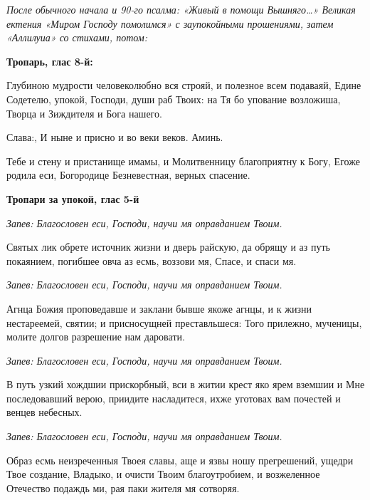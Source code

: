 \normalfont{} 


\mychapterending




\itshape  После обычного начала и 90-го псалма:\normalfont{} «Живый в помощи Вышняго…»
\itshape  Великая ектения\normalfont{} «Миром Господу помолимся» \itshape  с заупокойными
прошениями, затем\normalfont{} «Аллилуиа» \itshape  со стихами, потом:\normalfont{}


 

\bfseries Тропарь, глас 8-й:\normalfont{}

   Глубиною мудрости человеколюбно вся строяй, и полезное всем подаваяй,
Едине Содетелю, упокой, Господи, души раб Твоих: на Тя бо упование
возложиша, Творца и Зиждителя и Бога нашего.


   Слава:, И ныне и присно и во веки веков. Аминь.


   Тебе и стену и пристанище имамы, и Молитвенницу благоприятну к Богу,
Егоже родила еси, Богородице Безневестная, верных спасение.


 

\bfseries Тропари за упокой, глас 5-й\normalfont{}

 \itshape Запев:\normalfont{} Благословен еси, Господи, научи мя оправданием Твоим.


   Святых лик обрете источник жизни и дверь райскую, да обрящу и аз
путь покаянием, погибшее овча аз есмь, воззови мя, Спасе, и спаси
мя.


 \itshape Запев:\normalfont{} Благословен еси, Господи, научи мя оправданием Твоим.


   Агнца Божия проповедавше и заклани бывше якоже агнцы, и к жизни
нестареемей, святии; и присносущней преставльшеся: Того прилежно,
мученицы, молите долгов разрешение нам даровати.


 \itshape Запев:\normalfont{} Благословен еси, Господи, научи мя оправданием Твоим.


   В путь узкий хождшии прискорбный, вси в житии крест яко ярем
вземшии и Мне последовавший верою, приидите насладитеся, ихже уготовах
вам почестей и венцев небесных.


 \itshape Запев:\normalfont{} Благословен еси, Господи, научи мя оправданием Твоим.


   Образ есмь неизреченныя Твоея славы, аще и язвы ношу прегрешений,
ущедри Твое создание, Владыко, и очисти Твоим благоутробием, и
возжеленное Отечество подаждь ми, рая паки жителя мя сотворяя.


